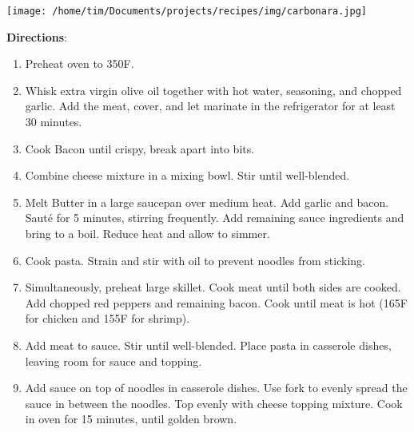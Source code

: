 \documentclass[11pt, twoside, openany]{book}
\begin{document}
\begin{minipage}[t]{\linewidth}
\begin{minipage}[t]{0.78\linewidth}
\begin{multicols}{2}
\begin{itemize}
\end{itemize}
\end{multicols}
\end{minipage}
\noindent\begin{minipage}[t]{0.18\linewidth}
\centering \strut\vspace*{-\baselineskip}\newline
\texttt{[image: /home/tim/Documents/projects/recipes/img/carbonara.jpg]}\\
\end{minipage}\vspace{3mm}
\textbf{Directions}:
\vspace{-3mm}\begin{enumerate}\setlength\itemsep{-1mm}
\item Preheat oven to 350F.
\item Whisk extra virgin olive oil together with hot water, seasoning, and chopped garlic. Add the meat, cover, and let marinate in the refrigerator for at least 30 minutes.
\item Cook Bacon until crispy, break apart into bits.
\item Combine cheese mixture in a mixing bowl. Stir until well-blended.
\item Melt Butter in a large saucepan over medium heat. Add garlic and bacon. Sauté for 5 minutes, stirring frequently.  Add remaining sauce ingredients and bring to a boil.  Reduce heat and allow to simmer.
\item Cook pasta. Strain and stir with oil to prevent noodles from sticking.
\item Simultaneously, preheat large skillet. Cook meat until both sides are cooked. Add chopped red peppers and remaining bacon. Cook until meat is hot (165F for chicken and 155F for shrimp).
\item Add meat to sauce. Stir until well-blended. Place pasta in casserole dishes, leaving room for sauce and topping.
\item Add sauce on top of noodles in casserole dishes. Use fork to evenly spread the sauce in between the noodles. Top evenly with cheese topping mixture. Cook in oven for 15 minutes, until golden brown.
\end{enumerate}
\end{minipage}\vspace{8mm}
\end{document}
